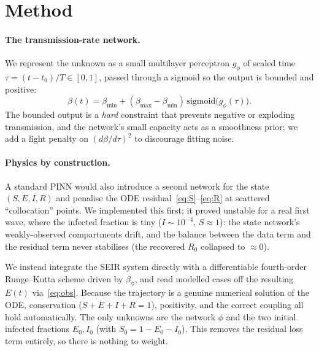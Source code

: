 \documentclass[10pt,twocolumn]{article}
\begin{document}
\section{Method}
\label{sec:method}
\paragraph{The transmission-rate network.}
We represent the unknown as a small multilayer perceptron $g_\phi$ of scaled time
$\tau=(t-t_0)/T\in[0,1]$, passed through a sigmoid so the output is bounded and
positive:
%
\begin{equation}
\beta(t) = \beta_{\min} + (\beta_{\max}-\beta_{\min})\,\mathrm{sigmoid}\!\big(g_\phi(\tau)\big).
\label{eq:betanet}
\end{equation}
%
The bounded output is a \emph{hard} constraint that prevents negative or exploding
transmission, and the network's small capacity acts as a smoothness prior; we add
a light penalty on $(d\beta/d\tau)^2$ to discourage fitting noise.

\paragraph{Physics by construction.}
A standard PINN would also introduce a second network for the state $(S,E,I,R)$
and penalise the ODE residual~\eqref{eq:S}--\eqref{eq:R} at scattered
``collocation'' points. We implemented this first; it proved unstable for a real
first wave, where the infected fraction is tiny ($I\!\sim\!10^{-4}$, $S\!\approx\!1$):
the state network's weakly-observed compartments drift, and the balance between
the data term and the residual term never stabilises (the recovered $R_0$
collapsed to $\approx 0$).

We instead integrate the SEIR system directly with a differentiable fourth-order
Runge--Kutta scheme driven by $\beta_\phi$, and read modelled cases off the
resulting $E(t)$ via~\eqref{eq:obs}. Because the trajectory is a genuine numerical
solution of the ODE, conservation ($S\!+\!E\!+\!I\!+\!R\!=\!1$), positivity, and
the correct coupling all hold automatically. The only unknowns are the network
$\phi$ and the two initial infected fractions $E_0,I_0$ (with $S_0=1-E_0-I_0$).
This removes the residual loss term entirely, so there is nothing to weight.
\end{document}
